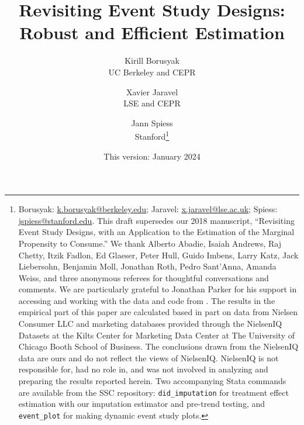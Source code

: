 \documentclass[english,11pt]{article}
\theoremstyle{plain}
\theoremstyle{plain}
\theoremstyle{plain}
\theoremstyle{plain}
\begin{document}
\title{Revisiting Event Study Designs:\\
Robust and Efficient Estimation{\Large{} }}
\author{\vspace{1.25cm}
}
\author{Kirill Borusyak\\
UC Berkeley and CEPR\and Xavier Jaravel\\
LSE and CEPR\and Jann Spiess\\
Stanford\thanks{Borusyak: \protect\href{mailto:k.borusyak@berkeley.edu}{k.borusyak@berkeley.edu};
Jaravel: \protect\href{mailto:x.jaravel@lse.ac.uk}{x.jaravel@lse.ac.uk};
Spiess: \protect\href{mailto:jspiess@stanford.edu}{jspiess@stanford.edu}.
This draft supersedes our 2018 manuscript, \textquotedblleft Revisiting
Event Study Designs, with an Application to the Estimation of the
Marginal Propensity to Consume.\textquotedblright{} We thank Alberto
Abadie, Isaiah Andrews, Raj Chetty, Itzik Fadlon, Ed Glaeser, Peter
Hull, Guido Imbens, Larry Katz, Jack Liebersohn, Benjamin Moll, Jonathan
Roth, Pedro Sant'Anna, Amanda Weiss, and three anonymous referees
for thoughtful conversations and comments. We are particularly grateful
to Jonathan Parker for his support in accessing and working with the
data and code from \textcite{Broda2014}. The results in the empirical
part of this paper are calculated based in part on data from Nielsen
Consumer LLC and marketing databases provided through the NielsenIQ
Datasets at the Kilts Center for Marketing Data Center at The University
of Chicago Booth School of Business. The conclusions drawn from the
NielsenIQ data are ours and do not reflect the views of NielsenIQ.
NielsenIQ is not responsible for, had no role in, and was not involved
in analyzing and preparing the results reported herein. Two accompanying
Stata commands are available from the SSC repository: \texttt{did\_imputation}
for treatment effect estimation with our imputation estimator and
pre-trend testing, and \texttt{event\_plot} for making dynamic event
study plots.}\vspace{0.25cm}
}
\date{This version: January 2024}
\maketitle
\end{document}
